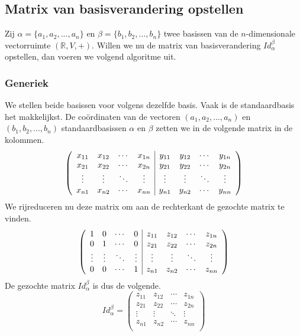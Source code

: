 \documentclass[lineaire_algebra_oplossingen.tex]{subfiles}
\begin{document}
\subsection{Matrix van basisverandering opstellen}
Zij $\alpha = \{a_1,a_2,...,a_n\}$ en $\beta = \{b_1,b_2,...,b_n\}$ twee basissen van de $n$-dimensionale vectorruimte $(\mathbb{R},V,+)$. Willen we nu de matrix van basisverandering $Id_\alpha^\beta$ opstellen, dan voeren we volgend algoritme uit.
\subsubsection*{Generiek}
We stellen beide basissen voor volgens dezelfde basis. Vaak is de standaardbasis het makkelijkst. %
De co\"ordinaten van de vectoren $(a_1,a_2,...,a_n)$ en $(b_1,b_2,...,b_n)$ standaardbasissen $\alpha$ en $\beta$ zetten we in de volgende matrix in de kolommen.
\[
\left(
\begin{array}{c c c c | c c c c}
x_{11} & x_{12} & \cdots & x_{1n} & y_{11} & y_{12} & \cdots & y_{1n}\\
x_{21} & x_{22} & \cdots & x_{2n} & y_{21} & y_{22} & \cdots & y_{2n}\\
\vdots & \vdots & \ddots & \vdots & \vdots & \vdots & \ddots & \vdots\\
x_{n1} & x_{n2} & \cdots & x_{nn} & y_{n1} & y_{n2} & \cdots & y_{nn}\\
\end{array}
\right)
\]
We rijreduceren nu deze matrix om aan de rechterkant de gezochte matrix te vinden.
\[
\left(
\begin{array}{c c c c | c c c c}
1 & 0 & \cdots & 0 & z_{11} & z_{12} & \cdots & z_{1n}\\
0 & 1 & \cdots & 0 & z_{21} & z_{22} & \cdots & z_{2n}\\
\vdots & \vdots & \ddots & \vdots & \vdots & \vdots & \ddots & \vdots\\
0 & 0 & \cdots & 1 & z_{n1} & z_{n2} & \cdots & z_{nn}\\
\end{array}
\right)
\]
De gezochte matrix $Id_\alpha^\beta$ is dus de volgende.
\[
Id_\alpha^\beta
=
\begin{pmatrix}
z_{11} & z_{12} & \cdots & z_{1n}\\
z_{21} & z_{22} & \cdots & z_{2n}\\
\vdots & \vdots & \ddots & \vdots\\
z_{n1} & z_{n2} & \cdots & z_{nn}\\
\end{pmatrix}
\]
\end{document}
